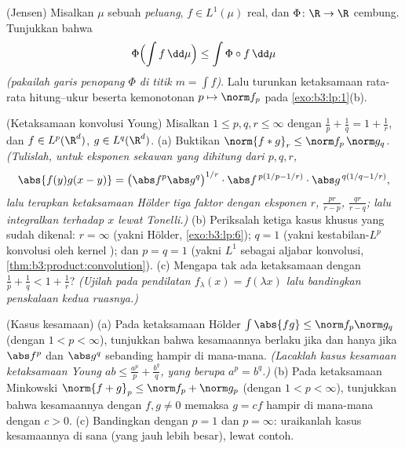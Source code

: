 \begin{exercise}[$\star\star$]\label{exo:b3:lp:10}
(Jensen) Misalkan $\mu$ sebuah  \emph{peluang}, $f \in
L^1(\mu)$ real, dan $\Phi \colon \R \to \R$ cembung. Tunjukkan bahwa
\[
\Phi\Bigl(\int f\,\dd\mu\Bigr) \leq \int \Phi\circ
f\,\dd\mu
\]
\emph{(pakailah garis penopang $\Phi$ di titik $m = \int f$)}.
Lalu turunkan ketaksamaan rata-rata hitung--ukur beserta
kemonotonan $p \mapsto \norm f_p$ pada
\cref{exo:b3:lp:1}(b).
\end{exercise}

\begin{exercise}[$\star\star\star$]\label{exo:b3:lp:11}
(Ketaksamaan konvolusi Young) Misalkan $1 \leq p, q, r \leq
\infty$ dengan $\frac1p + \frac1q = 1 + \frac1r$, dan $f \in
L^p(\R^d)$, $g \in L^q(\R^d)$.
(a) Buktikan $\norm{f * g}_r \leq \norm f_p\,\norm g_q$.
\emph{(Tulislah, untuk eksponen sekawan yang dihitung dari $p, q,
r$,
\[
\abs{f(y)g(x-y)} = \bigl(\abs f^p\abs g^q\bigr)^{1/r}
\cdot\abs f^{\,p(1/p - 1/r)}\cdot\abs g^{\,q(1/q - 1/r)},
\]
lalu terapkan ketaksamaan Hölder tiga faktor dengan
eksponen $r$, $\frac{pr}{r - p}$, $\frac{qr}{r - q}$; lalu
integralkan terhadap $x$ lewat Tonelli.)}
(b) Periksalah ketiga kasus khusus yang sudah dikenal: $r =
\infty$ (yakni Hölder, \cref{exo:b3:lp:6}); $q = 1$
(yakni kestabilan-$L^p$ konvolusi oleh kernel );
dan $p = q = 1$ (yakni $L^1$ sebagai aljabar konvolusi,
\cref{thm:b3:product:convolution}).
(c) Mengapa tak ada ketaksamaan dengan $\frac1p + \frac1q < 1 +
\frac1r$? \emph{(Ujilah pada pendilatan $f_\lambda(x) =
f(\lambda x)$ lalu bandingkan penskalaan kedua ruasnya.)}
\end{exercise}

\begin{exercise}[$\star\star$]\label{exo:b3:lp:12}
(Kasus kesamaan) (a) Pada ketaksamaan Hölder
$\int\abs{fg} \leq \norm f_p\norm g_q$ (dengan $1 < p < \infty$),
tunjukkan bahwa kesamaannya berlaku jika dan hanya jika $\abs f^p$ dan $\abs g^q$
sebanding hampir di mana-mana. \emph{(Lacaklah kasus kesamaan ketaksamaan
Young $ab \leq \frac{a^p}p + \frac{b^q}q$, yang berupa $a^p
= b^q$.)}
(b) Pada ketaksamaan Minkowski $\norm{f + g}_p \leq \norm f_p
+ \norm g_p$ (dengan $1 < p < \infty$), tunjukkan bahwa kesamaannya dengan $f,
g \neq 0$ memaksa $g = cf$ hampir di mana-mana dengan $c > 0$.
(c) Bandingkan dengan $p = 1$ dan $p = \infty$: uraikanlah
kasus kesamaannya di sana (yang jauh lebih besar), lewat contoh.
\end{exercise}

